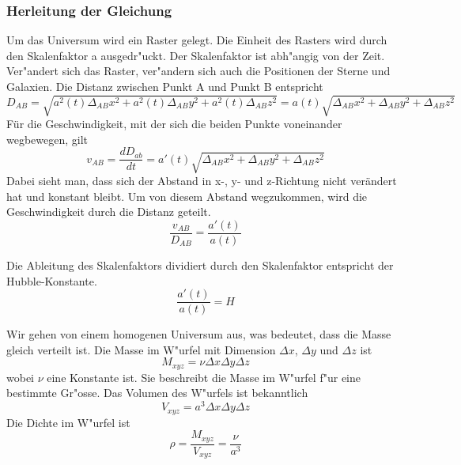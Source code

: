 \begin{refsection}
\subsubsection{Herleitung der Gleichung}
Um das Universum wird ein Raster gelegt. Die Einheit des Rasters wird durch den Skalenfaktor a ausgedr"uckt. Der Skalenfaktor ist abh"angig von der Zeit. Ver"andert sich das Raster, ver"andern sich auch die Positionen der Sterne und Galaxien.
Die Distanz zwischen Punkt A und Punkt B entspricht 
\begin{equation}
D_{AB} = \sqrt{a^2(t)\Delta_{AB}x^2 + a^2(t)\Delta_{AB}y^2 + a^2(t)\Delta_{AB}z^2} = a(t) \sqrt{\Delta_{AB}x^2 + \Delta_{AB}y^2 + \Delta_{AB}z^2}
\end{equation}
F\"{u}r die Geschwindigkeit, mit der sich die beiden Punkte voneinander wegbewegen, gilt 
\begin{equation}
v_{AB} = \dfrac{dD_{ab}}{dt} 
	   = a'(t) \sqrt{\Delta_{AB}x^2 + \Delta_{AB}y^2 + \Delta_{AB}z^2}
\end{equation}
Dabei sieht man, dass sich der Abstand in x-, y- und z-Richtung nicht ver\"{a}ndert hat und konstant bleibt. Um von diesem Abstand wegzukommen, wird die Geschwindigkeit durch die Distanz geteilt.
\begin{equation}
\frac{v_{AB} }{D_{AB}} = \frac{a'(t)}{a(t)}
\end{equation}
\begin{satz} 
	Die Ableitung des Skalenfaktors dividiert durch den Skalenfaktor entspricht der Hubble-Konstante.
	\[
	\frac{a'(t)}{a(t)} = H
	\]
\end{satz}
Wir gehen von einem homogenen Universum aus, was bedeutet, dass die Masse gleich verteilt ist. Die Masse im W"urfel mit Dimension $\Delta x$, $\Delta y$ und $\Delta z$ ist 
\begin{equation}
M_{xyz} = \nu \Delta x \Delta y \Delta z
\end{equation}
wobei $\nu$ eine Konstante ist. Sie beschreibt die Masse im W"urfel f"ur eine bestimmte Gr"osse. Das Volumen des W"urfels ist bekanntlich 
\begin{equation}
V_{xyz} = a^3 \Delta x \Delta y \Delta z
\end{equation}
Die Dichte im W"urfel ist  
\begin{equation}
\rho = \frac{M_{xyz}}{V_{xyz}} = \frac{\nu}{a^3}
\label{friedmann:dichte}
\end{equation}

\end{refsection}
